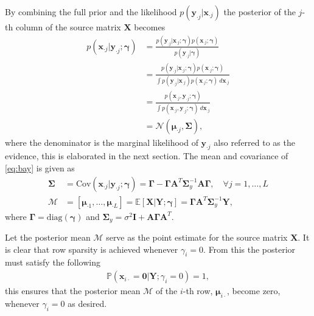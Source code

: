 By combining the full prior and the likelihood $p(\mathbf{y}_{\cdot j} \vert \mathbf{x}_{\cdot j})$ the posterior of the $j$-th column of the source matrix $\mathbf{X}$ becomes
\begin{align}
p(\mathbf{x}_{\cdot j} \vert \mathbf{y}_{\cdot j} ; \boldsymbol{\gamma}) &= \frac{p(\mathbf{y}_{\cdot j} | \mathbf{x}_{\cdot j} ; \boldsymbol{\gamma}) p(\mathbf{x}_{\cdot j} ; \boldsymbol{\gamma})}{p(\mathbf{y}_{\cdot j} | \boldsymbol{\gamma})} \nonumber \\
&= \frac{p(\mathbf{y}_{\cdot j} | \mathbf{x}_{\cdot j} ; \boldsymbol{\gamma}) p(\mathbf{x}_{\cdot j} ; \boldsymbol{\gamma})}{\int p(\mathbf{y}_{\cdot j} | \mathbf{x}_{\cdot j}) p(\mathbf{x}_{\cdot j} ; \boldsymbol{\gamma}) \ d \mathbf{x}_{\cdot j}} \nonumber \\ 
&= \frac{p(\mathbf{x}_{\cdot j}, \mathbf{y}_{\cdot j} ; \boldsymbol{\gamma})}{\int p(\mathbf{x}_{\cdot j}, \mathbf{y}_{\cdot j} ; \boldsymbol{\gamma}) \ d \mathbf{x}_{\cdot j}} \nonumber \\ 
&= \mathcal{N}(\boldsymbol{\mu}_{\cdot j}, \boldsymbol{\Sigma}),\label{eq:bay}
\end{align}
where the denominator is the marginal likelihood of $\mathbf{y}_{\cdot j}$ also referred to as the evidence, this is elaborated in the next section. The mean and covariance of \eqref{eq:bay} is given as
\begin{align}
\boldsymbol{\Sigma} &= \text{Cov}(\mathbf{x}_{\cdot j} \vert \mathbf{y}_{\cdot j} ; \boldsymbol{\gamma}) = \boldsymbol{\Gamma} - \boldsymbol{\Gamma} \mathbf{A}^T \boldsymbol{\Sigma}_y^{-1} \mathbf{A} \boldsymbol{\Gamma}, \quad \forall j = 1, \dots, L \label{eq:moments1} \\
\mathcal{M} &= [\boldsymbol{\mu}_{\cdot 1}, \dots, \boldsymbol{\mu}_{\cdot L}] = \mathbb{E}[\mathbf{X} \vert \mathbf{Y} ; \boldsymbol{\gamma}] = \boldsymbol{\Gamma} \mathbf{A}^T \boldsymbol{\Sigma}_y^{-1} \mathbf{Y}, \label{eq:moments2} 
\end{align}
where $\boldsymbol{\Gamma} = \text{diag}(\boldsymbol{\gamma})$ and $\boldsymbol{\Sigma}_y = \sigma^2 \mathbf{I} + \mathbf{A} \boldsymbol{\Gamma} \mathbf{A}^T$. 

Let the posterior mean $\mathcal{M}$ serve as the point estimate for the source matrix $\mathbf{X}$.
It is clear that row sparsity is achieved whenever $\gamma_i = 0$. 
From this the posterior must satisfy the following 
\begin{align*}
\mathbb{P}(\mathbf{x}_{i \cdot} = \mathbf{0} \vert \mathbf{Y} ; \gamma_i = 0) = 1,
\end{align*}
this ensures that the posterior mean $\mathcal{M}$ of the $i$-th row, $\boldsymbol{\mu}_{i \cdot}$, become zero, whenever $\gamma_i = 0$ as desired.

